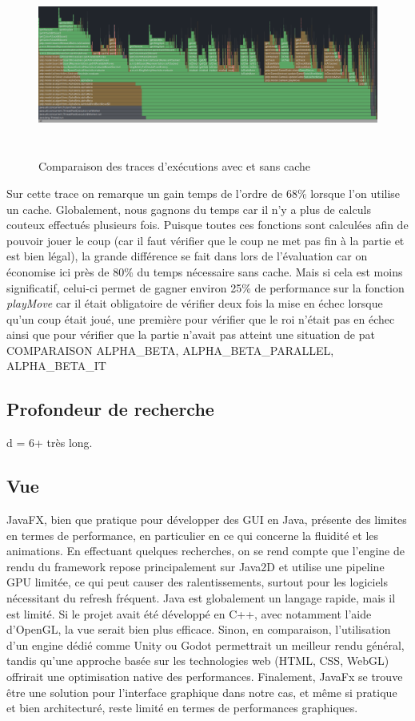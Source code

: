 \documentclass{article}
\begin{document}
\begin{figure}[h]
    \centering
    \includegraphics[width=\textwidth,height=6.0cm,keepaspectratio]{cache_compare.png}
    \caption{Comparaison des traces d'exécutions avec et sans cache}
    \label{cache_cmp}
\end{figure}

Sur cette trace on remarque un gain temps de l'ordre de 68\% lorsque l'on utilise un cache. Globalement, nous gagnons du temps car il n'y a plus de calculs couteux
effectués plusieurs fois. Puisque toutes ces fonctions sont calculées afin de pouvoir jouer le coup (car il faut vérifier que le coup ne met pas fin à la partie et 
est bien légal), la grande différence se fait dans lors de l'évaluation car on économise ici près de 80\% du temps nécessaire sans cache. Mais si cela est moins significatif,
celui-ci permet de gagner environ 25\% de performance sur la fonction \textit{playMove} car il était obligatoire de vérifier deux fois la mise en échec lorsque qu'un coup était joué,
une première pour vérifier que le roi n'était pas en échec ainsi que pour vérifier que la partie n'avait pas atteint une situation de pat
COMPARAISON ALPHA\_BETA, ALPHA\_BETA\_PARALLEL, ALPHA\_BETA\_IT

\subsection{Profondeur de recherche}
d = 6+ très long.

\subsection{Vue}
JavaFX, bien que pratique pour développer des GUI en Java, présente des limites en termes de performance, en particulier en ce qui concerne
la fluidité et les animations. En effectuant quelques recherches, on se rend compte que l'engine de rendu du framework repose principalement
sur Java2D et utilise une pipeline GPU limitée, ce qui peut causer des ralentissements, surtout pour les logiciels nécessitant du refresh
fréquent. Java est globalement un langage rapide, mais il est limité. Si le projet avait été développé en C++, avec notamment
l'aide d'OpenGL, la vue serait bien plus efficace. Sinon, en comparaison, l'utilisation d'un engine dédié comme Unity ou Godot permettrait
un meilleur rendu général, tandis qu'une approche basée sur les technologies web (HTML, CSS, WebGL) offrirait une
optimisation native des performances. Finalement, JavaFx se trouve être une solution pour l'interface graphique dans notre cas, et même si
pratique et bien architecturé, reste limité en termes de performances graphiques.
\end{document}
